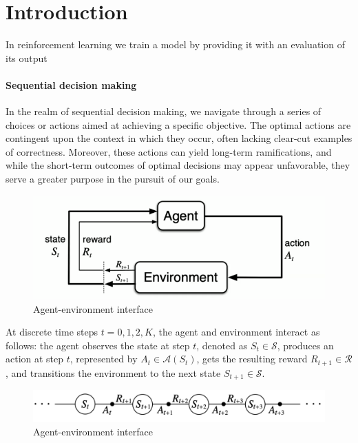 \section{Introduction}

In reinforcement learning we train a model by providing it with an evaluation of its output

\paragraph*{Sequential decision making}
In the realm of sequential decision making, we navigate through a series of choices or actions aimed at achieving a specific objective. 
The optimal actions are contingent upon the context in which they occur, often lacking clear-cut examples of correctness. 
Moreover, these actions can yield long-term ramifications, and while the short-term outcomes of optimal decisions may appear unfavorable, they serve a greater purpose in the pursuit of our goals.
\begin{figure}[H]
    \centering
    \includegraphics[width=0.75\linewidth]{images/rl.png}
    \caption{Agent-environment interface}
\end{figure}
At discrete time steps $t = 0, 1, 2, K$, the agent and environment interact as follows: the agent observes the state at step $t$, denoted as $S_t \in \mathcal{S}$, produces an action at step $t$, represented by $A_t \in \mathcal{A}(S_t)$, gets the resulting reward $R_{t+1} \in \mathcal{R}$, and transitions the environment to the next state $S_{t+1} \in \mathcal{S}$.
\begin{figure}[H]
    \centering
    \includegraphics[width=0.75\linewidth]{images/rl1.png}
    \caption{Agent-environment interface}
\end{figure}